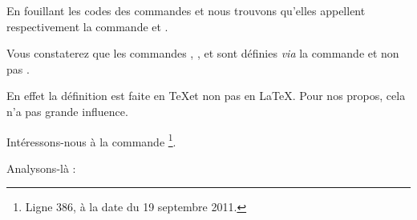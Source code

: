 En fouillant les codes des commandes  et  nous trouvons qu'elles appellent respectivement la commande  et .

\begin{plusloins}
Vous constaterez que les commandes , ,  et  sont définies \emph{via} la commande  et non pas . 

En effet la définition est faite en \TeX et non pas en \LaTeX. Pour nos propos, cela n'a pas grande influence.
\end{plusloins} 

Intéressons-nous à la commande \footnote{Ligne 386, à la date du 19 septembre 2011.}.

\begin{latexcode}
\def\@makechapterhead#1{%
  \vspace*{50\p@}%
  {\parindent \z@ \raggedright \normalfont
    \ifnum \c@secnumdepth >\m@ne
      \if@mainmatter
        \huge\bfseries \@chapapp\space \thechapter
        \par\nobreak
        \vskip 20\p@
      \fi
    \fi
    \interlinepenalty\@M
    \Huge \bfseries #1\par\nobreak
    \vskip 40\p@
  }}
\end{latexcode}

Analysons-là :

